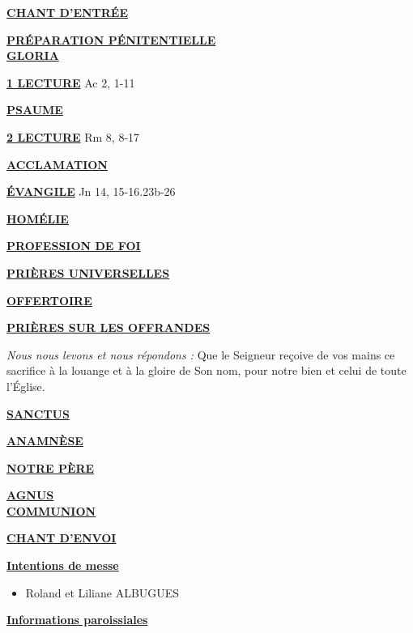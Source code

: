 \documentclass[french,11pt,a4paper]{article}
\newcommand*{\chants}{../chants}
\newcommand*{\messe}{../messe_bienveillance}
\newcommand*{\pu}{../pu}
\newcommand*{\psaumes}{../psaumes}
\newcommand{\NewsItem}[1]{%
\vspace{3pt}
\underline{\textbf{#1}}
		  }
\begin{document}
\NewsItem{CHANT D'ENTRÉE}
	
\NewsItem{PRÉPARATION PÉNITENTIELLE} \\
	

\NewsItem{GLORIA}
	


\NewsItem{1\iere{} LECTURE} Ac 2, 1-11

\NewsItem{PSAUME}


\NewsItem{2\ieme{} LECTURE} Rm 8, 8-17

\NewsItem{ACCLAMATION}


\NewsItem{ÉVANGILE} Jn 14, 15-16.23b-26 

\NewsItem{HOMÉLIE}

\NewsItem{PROFESSION DE FOI}


\NewsItem{PRIÈRES UNIVERSELLES} 


\NewsItem{OFFERTOIRE}

\NewsItem{PRIÈRES SUR LES OFFRANDES}
\textit{Nous nous levons et nous répondons : }
Que le Seigneur reçoive de vos mains ce sacrifice à la louange et à la gloire 
de Son nom, pour notre bien et celui de toute l’Église.

\NewsItem{SANCTUS}


\NewsItem{ANAMNÈSE}


\NewsItem{NOTRE PÈRE}

\NewsItem{AGNUS} \\


\NewsItem{COMMUNION}


\NewsItem{CHANT D'ENVOI}



\newpage


\NewsItem{Intentions de messe}
\begin{itemize}
\item[\Cross]
Roland et Liliane ALBUGUES
\end{itemize}

\NewsItem{Informations paroissiales}
\end{document}
